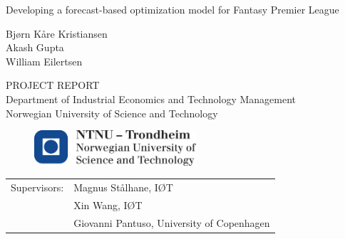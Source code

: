 \vspace*{7cm}


\begin{center}{\vspace{-7cm}}
{\Huge Developing a forecast-based optimization model for Fantasy Premier League}
\end{center}
\vspace*{7cm}

\begin{center}{\vspace{-4cm}}
{\Large Bj\o rn K\aa re Kristiansen} \\ 
{\Large Akash Gupta} \\
{\Large William Eilertsen}
\end{center}

\begin{center}{\vspace{2cm}}
   PROJECT REPORT \\ 
   Department of Industrial Economics and Technology Management\\
Norwegian University of Science and Technology
\end{center}

\begin{figure}[H]{\vspace{0.5cm}}
    \centering
    \includegraphics[width = 60mm,scale=0.5]{fig/ntnu_logo.png}
\end{figure}


\begin{table}[b]
    \begin{tabular}{ll}
       Supervisors:  & Magnus St\aa lhane, I\O T \\ 
                     & Xin Wang, I\O T \\
                     & Giovanni Pantuso, University of Copenhagen \\ 
    \end{tabular}
\end{table}

\cleardoublepage